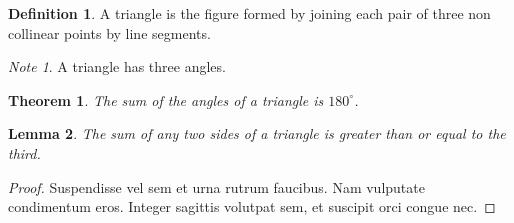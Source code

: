 \documentclass{article}
\newtheorem{thm}{Theorem}[section]
\theoremstyle{definition}
\newtheorem{dfn}{Definition}[section]
\theoremstyle{remark}
\newtheorem{note}{Note}[section]
\theoremstyle{plain}
\newtheorem{lem}[thm]{Lemma}
\begin{document}
\begin{dfn}
A triangle is the figure formed by joining each pair
of three non collinear points by line segments.
\end{dfn}
\begin{note}
A triangle has three angles.
\end{note}
\begin{thm}
The sum of the angles of a triangle is $180^\circ$.
\end{thm}

\begin{lem}
The sum of any two sides of a triangle is greater than or equal to the third.
\end{lem}
\begin{proof}
Suspendisse vel sem et urna rutrum faucibus. Nam vulputate condimentum eros. Integer sagittis volutpat sem, et suscipit orci congue nec.
\end{proof}
\end{document}
